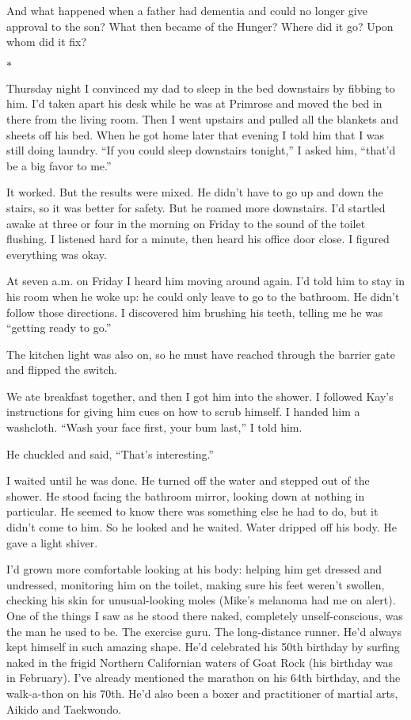 \documentclass[12pt]{book}
\begin{document}
And what happened when a father had dementia and could no longer give approval to the son? What then became of the Hunger? Where did it go? Upon whom did it fix?

\begin{center}$*$\end{center}

Thursday night I convinced my dad to sleep in the bed downstairs by fibbing to him. I'd taken apart his desk while he was at Primrose and moved the bed in there from the living room. Then I went upstairs and pulled all the blankets and sheets off his bed. When he got home later that evening I told him that I was still doing laundry. ``If you could sleep downstairs tonight,'' I asked him, ``that'd be a big favor to me.''

It worked. But the results were mixed. He didn't have to go up and down the stairs, so it was better for safety. But he roamed more downstairs. I'd startled awake at three or four in the morning on Friday to the sound of the toilet flushing. I listened hard for a minute, then heard his office door close. I figured everything was okay.

At seven a.m. on Friday I heard him moving around again. I'd told him to stay in his room when he woke up: he could only leave to go to the bathroom. He didn't follow those directions. I discovered him brushing his teeth, telling me he was ``getting ready to go.''

The kitchen light was also on, so he must have reached through the barrier gate and flipped the switch.

We ate breakfast together, and then I got him into the shower. I followed Kay's instructions for giving him cues on how to scrub himself. I handed him a washcloth. ``Wash your face first, your bum last,'' I told him.

He chuckled and said, ``That's interesting.''

I waited until he was done. He turned off the water and stepped out of the shower. He stood facing the bathroom mirror, looking down at nothing in particular. He seemed to know there was something else he had to do, but it didn't come to him. So he looked and he waited. Water dripped off his body. He gave a light shiver.

I'd grown more comfortable looking at his body: helping him get dressed and undressed, monitoring him on the toilet, making sure his feet weren't swollen, checking his skin for unusual-looking moles (Mike's melanoma had me on alert). One of the things I saw as he stood there naked, completely unself-conscious, was the man he used to be. The exercise guru. The long-distance runner. He'd always kept himself in such amazing shape. He'd celebrated his 50th birthday by surfing naked in the frigid Northern Californian waters of Goat Rock (his birthday was in February). I've already mentioned the marathon on his 64th birthday, and the walk-a-thon on his 70th. He'd also been a boxer and practitioner of martial arts, Aikido and Taekwondo.
\end{document}
